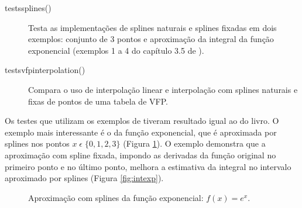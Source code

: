 \documentclass[final,5p]{elsarticle}
\numberwithin{equation}{section}
\begin{document}
        \begin{description}
            \item[tests\textunderscore splines()] Testa as implementações de splines naturais e splines fixadas em dois exemplos: conjunto de 3 pontos e aproximação da integral da função exponencial (exemplos 1 a 4 do capítulo 3.5 de \cite{burden2016analise}).
            
            \item[tests\textunderscore vfp\textunderscore interpolation()] Compara o uso de interpolação linear e interpolação com splines naturais e fixas de pontos de uma tabela de VFP.
        \end{description}

        Os testes que utilizam os exemplos de \cite{burden2016analise} tiveram resultado igual ao do livro. O exemplo mais interessante é o da função exponencial, que é aproximada por splines nos pontos $x \; \epsilon \; \{0,1, 2, 3\}$ (Figura \ref{fig:exp}). O exemplo demonstra que a aproximação com spline fixada, impondo as derivadas da função original no primeiro ponto e no último ponto, melhora a estimativa da integral no intervalo aproximado por splines (Figura \ref{fig:intexp}).
        
        \begin{figure}[hbt!] 
            \caption{Aproximação com splines da função exponencial: $f(x) = e^x$.}
            \label{fig:exp}
        \end{figure}
                
\end{document}
